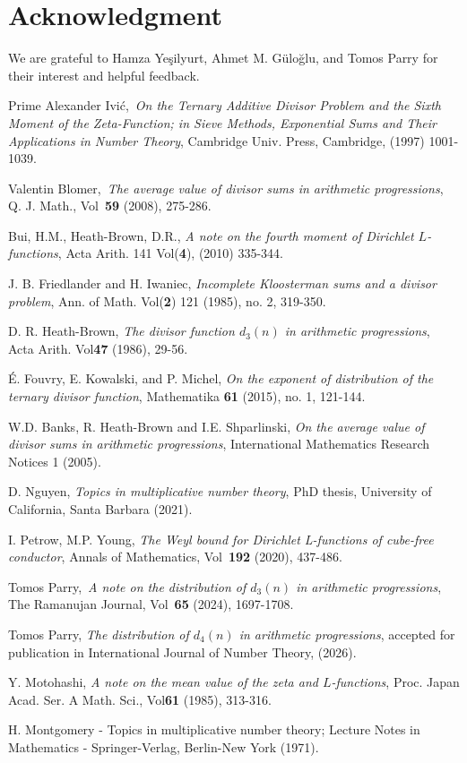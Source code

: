 \documentclass[oneside,reqno,10pt]{amsart}
\numberwithin{equation}{section}
\theoremstyle{plain}
\theoremstyle{definition}
\numberwithin{equation}{section}
\begin{document}
\section{Acknowledgment}
We are grateful to Hamza Ye\c{s}ilyurt, Ahmet M. Gülo\u{g}lu, and Tomos Parry for their interest and helpful feedback.

\begin{thebibliography}{Prime}
 Alexander Ivi\'c,\ \emph{On the Ternary Additive Divisor Problem and the Sixth Moment of the Zeta-Function; in Sieve Methods, Exponential Sums and Their Applications in Number Theory}, Cambridge Univ. Press, Cambridge, (1997) 1001-1039.

 Valentin Blomer,\ \emph{The average value of divisor sums in arithmetic progressions}, Q. J. Math., Vol\ \textbf{59} (2008), 275-286.

Bui, H.M., Heath-Brown, D.R., \emph{A note on the fourth moment of Dirichlet  $L$-functions}, Acta Arith. 141 Vol(\textbf{4}), (2010) 335-344.

J. B. Friedlander and H. Iwaniec, \emph{Incomplete Kloosterman sums and a divisor problem}, Ann. of Math. Vol(\textbf{2}) 121 (1985), no. 2, 319-350.

 D. R. Heath-Brown, \emph{The divisor function $d_3(n)$ in arithmetic progressions}, Acta Arith. Vol\textbf{47} (1986), 29-56.

\'E. Fouvry, E. Kowalski, and P. Michel, \emph{On the exponent of distribution of the ternary divisor function}, Mathematika \textbf{61} (2015), no. 1, 121-144.


W.D. Banks, R. Heath-Brown and I.E. Shparlinski, \emph{On the average value of divisor sums in arithmetic progressions}, International Mathematics Research Notices 1 (2005).


 D. Nguyen, \emph{Topics in multiplicative number theory}, PhD thesis, University of California, Santa Barbara
(2021).



 I. Petrow, M.P. Young,  \emph{The Weyl bound for Dirichlet L-functions of cube-free conductor}, Annals of Mathematics, Vol\ \textbf{192} (2020), 437-486.

 Tomos Parry,\ \emph{A note on the distribution of $d_3(n)$ in arithmetic progressions}, The Ramanujan Journal, Vol\ \textbf{65} (2024), 1697-1708.

Tomos Parry, \emph{The distribution of $d_4(n)$ in arithmetic progressions}, accepted for publication in International Journal of Number Theory, (2026). 


Y. Motohashi,  \emph{A note on the mean value of the zeta and $L$-functions},  Proc. Japan Acad. Ser. A
Math. Sci., Vol\textbf{61} (1985), 313-316.


H. Montgomery - Topics in multiplicative number theory; Lecture Notes in Mathematics - Springer-Verlag,
Berlin-New York (1971).

\end{thebibliography}
\end{document}
